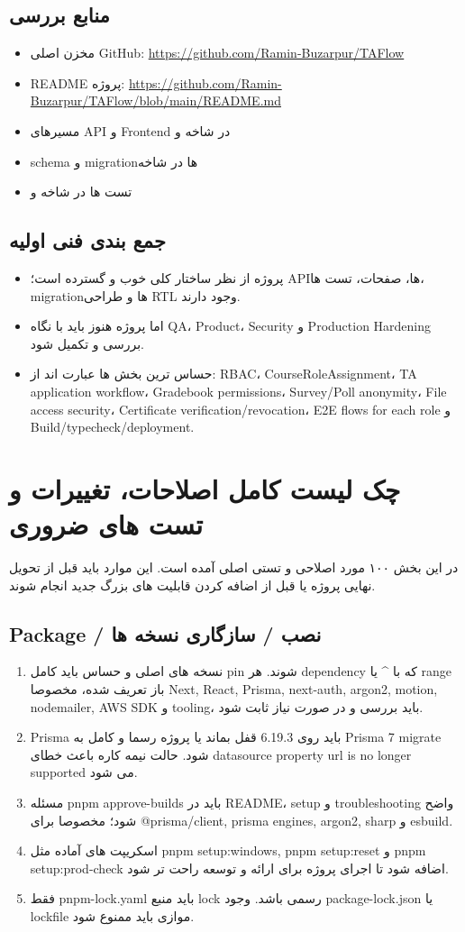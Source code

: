 \documentclass[11pt,a4paper]{article}
\begin{document}
\subsection{منابع بررسی}
\begin{itemize}
\item مخزن اصلی GitHub: \url{https://github.com/Ramin-Buzarpur/TAFlow}
\item README پروژه: \url{https://github.com/Ramin-Buzarpur/TAFlow/blob/main/README.md}
\item مسیرهای API و Frontend در شاخه  و 
\item schema و migrationها در شاخه 
\item تست ها در شاخه  و 
\end{itemize}
\subsection{جمع بندی فنی اولیه}
\begin{itemize}
\item پروژه از نظر ساختار کلی خوب و گسترده است؛ APIها، صفحات، تست ها، migrationها و طراحی RTL وجود دارند.
\item اما پروژه هنوز باید با نگاه QA، Product، Security و Production Hardening بررسی و تکمیل شود.
\item حساس ترین بخش ها عبارت اند از: RBAC، CourseRoleAssignment، TA application workflow، Gradebook permissions، Survey/Poll anonymity، File access security، Certificate verification/revocation، E2E flows for each role و Build/typecheck/deployment.
\end{itemize}
\section{چک لیست کامل اصلاحات، تغییرات و تست های ضروری}
در این بخش ۱۰۰ مورد اصلاحی و تستی اصلی آمده است. این موارد باید قبل از تحویل نهایی پروژه یا قبل از اضافه کردن قابلیت های بزرگ جدید انجام شوند.
\subsection{Package / نصب / سازگاری نسخه ها}
\begin{enumerate}[label=\arabic*.]
\item نسخه های اصلی و حساس باید کامل pin شوند. هر dependency که با \textasciicircum{} یا range باز تعریف شده، مخصوصا Next, React, Prisma, next-auth, argon2, motion, nodemailer, AWS SDK و tooling، باید بررسی و در صورت نیاز ثابت شود.
\item Prisma باید روی 6.19.3 قفل بماند یا پروژه رسما و کامل به Prisma 7 migrate شود. حالت نیمه کاره باعث خطای datasource property url is no longer supported می شود.
\item مسئله pnpm approve-builds باید در README، setup و troubleshooting واضح شود؛ مخصوصا برای @prisma/client, prisma engines, argon2, sharp و esbuild.
\item اسکریپت های آماده مثل pnpm setup:windows, pnpm setup:reset و pnpm setup:prod-check اضافه شود تا اجرای پروژه برای ارائه و توسعه راحت تر شود.
\item فقط pnpm-lock.yaml باید منبع lock رسمی باشد. وجود package-lock.json یا lockfile موازی باید ممنوع شود.
\end{enumerate}
\end{document}
